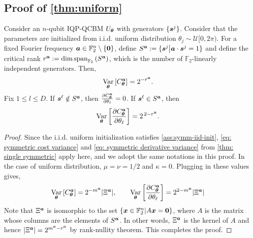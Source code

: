 \documentclass{article}
\theoremstyle{plain}
\theoremstyle{definition}
\theoremstyle{remark}
\begin{document}
\subsection{Proof of \cref{thm:uniform}}
Consider an $n$-qubit IQP-QCBM $U_{\bm{\theta}}$ with generators $\{{\bm{s}^j}\}$. Consider that the parameters are initialized from i.i.d. uniform distribution $\theta_j \sim\mathcal{U}[0,2\pi)$. For a fixed Fourier frequency ${\bm{a}} \in \mathbb{F}_2^n \setminus \{\mathbf{0}\}$, define $S^{{\bm{a}}} := \{ {\bm{s}^j} \big| {\bm{a}} \cdot {\bm{s}^j} = 1 \}$ and define the critical rank $r^{\bm{a}} := \dim \operatorname{span}_{\mathbb{F}_2}\left( S^{{\bm{a}}} \right)$, which is the number of $\mathbb{F}_2$-linearly independent generators. Then, \begin{equation}
\operatorname*{Var}_{{\bm{\theta}}} \left[ C^{\bm{a}}_{\bm{\theta}}\right] = 2^{-r^{\bm{a}}}. 
\end{equation} Fix $1\leq l \leq D$. If ${\bm{s}^\ell} \notin S^{\bm{a}}$, then $ \frac{\partial C^{\bm{a}}_{\bm{\theta}}}{\partial \theta_\ell}=0$. If ${\bm{s}^\ell} \in S^{\bm{a}}$, then
\begin{equation}
\operatorname*{Var}_{{\bm{\theta}}} \left[ \frac{\partial C^{\bm{a}}_{\bm{\theta}}}{\partial \theta_\ell} \right] = 2^{\,2-r^{\bm{a}}}. \end{equation}
\begin{proof}
Since the i.i.d. uniform initialization satisfies \cref{ass:symm-iid-init}, \cref{eq: symmetric cost variance} and \cref{eq: symmetric derivative variance} from \cref{thm: single symmetric} apply here, and we adopt the same notations in this proof. In the case of uniform distribution, $\mu = \nu = 1/2$ and $\kappa = 0$. Plugging in these values gives, \begin{equation}
    \operatorname*{Var}_{\bm{\theta}} \left[ C^{\bm{a}}_{\bm{\theta}} \right] = 2^{-m^{\bm{a}}} \abs{\Xi^{\bm{a}}} , \qquad \operatorname*{Var}_{{\bm{\theta}}}\left[\frac{\partial C^{\bm{a}}_{\bm{\theta}}}{\partial\theta_\ell}\right]
= 2^{2-m^{\bm{a}}} \abs{\Xi^{\bm{a}}} 
\end{equation}
Note that $\Xi^{\bm{a}}$ is isomorphic to the set $\{{\bm{x}} \in \mathbb{F}_2^n | A {\bm{x}} = \bm{0}\}$, where $A$ is the matrix whose columns are the elements of $S^{\bm{a}}$. In other words, $\Xi^{\bm{a}}$ is the kernel of $A$ and hence $\abs{\Xi^{\bm{a}}} = 2^{m^{\bm{a}}-r^{\bm{a}}}$ by rank-nullity theorem. This completes the proof.
\end{proof}
\end{document}
